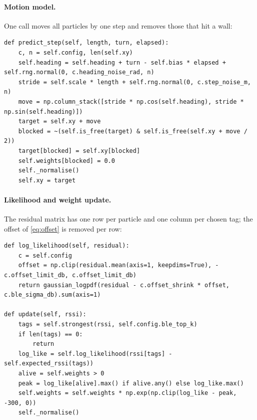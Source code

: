 \documentclass[11pt,a4paper]{article}
\begin{document}
\paragraph{Motion model.} One call moves all particles by one step and removes those that
hit a wall:
\begin{lstlisting}
def predict_step(self, length, turn, elapsed):
    c, n = self.config, len(self.xy)
    self.heading = self.heading + turn - self.bias * elapsed + self.rng.normal(0, c.heading_noise_rad, n)
    stride = self.scale * length + self.rng.normal(0, c.step_noise_m, n)
    move = np.column_stack([stride * np.cos(self.heading), stride * np.sin(self.heading)])
    target = self.xy + move
    blocked = ~(self.is_free(target) & self.is_free(self.xy + move / 2))
    target[blocked] = self.xy[blocked]
    self.weights[blocked] = 0.0
    self._normalise()
    self.xy = target
\end{lstlisting}

\paragraph{Likelihood and weight update.} The residual matrix has one row per particle
and one column per chosen tag; the offset of \cref{eq:offset} is removed per row:
\begin{lstlisting}
def log_likelihood(self, residual):
    c = self.config
    offset = np.clip(residual.mean(axis=1, keepdims=True), -c.offset_limit_db, c.offset_limit_db)
    return gaussian_logpdf(residual - c.offset_shrink * offset, c.ble_sigma_db).sum(axis=1)

def update(self, rssi):
    tags = self.strongest(rssi, self.config.ble_top_k)
    if len(tags) == 0:
        return
    log_like = self.log_likelihood(rssi[tags] - self.expected_rssi(tags))
    alive = self.weights > 0
    peak = log_like[alive].max() if alive.any() else log_like.max()
    self.weights = self.weights * np.exp(np.clip(log_like - peak, -300, 0))
    self._normalise()
\end{lstlisting}
\end{document}
